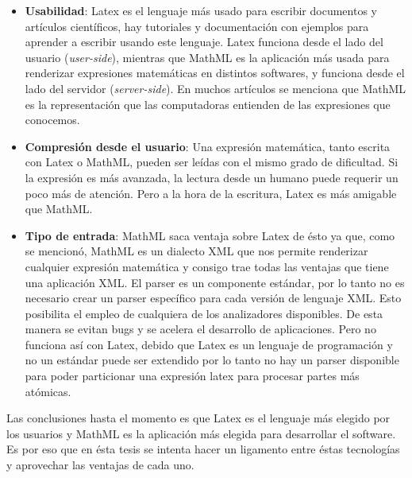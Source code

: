 \begin{itemize}
\item \textbf{Usabilidad}: Latex es el lenguaje más usado para escribir documentos y artículos científicos, hay tutoriales y documentación con ejemplos para aprender a escribir usando este lenguaje. Latex funciona desde el lado del usuario (\textit{user-side}), mientras que MathML es la aplicación más usada para renderizar expresiones matemáticas en distintos softwares, y funciona desde el lado del servidor (\textit{server-side}). En muchos artículos se menciona que MathML es la representación que las computadoras entienden de las expresiones que conocemos.
\item \textbf{Compresión desde el usuario}: Una expresión matemática, tanto escrita con Latex o MathML, pueden ser leídas con el mismo grado de dificultad. Si la expresión es más avanzada, la lectura desde un humano puede requerir un poco más de atención. Pero a la hora de la escritura, Latex es más amigable que MathML.
\item \textbf{Tipo de entrada}: MathML saca ventaja sobre Latex de ésto ya que, como se mencionó, MathML es un dialecto XML que nos permite renderizar cualquier expresión matemática y consigo trae todas las ventajas que tiene una aplicación XML. El parser es un componente estándar, por lo tanto no es necesario crear un parser específico para cada versión de lenguaje XML. Esto posibilita el empleo de cualquiera de los analizadores disponibles. De esta manera se evitan bugs y se acelera el desarrollo de aplicaciones. Pero no funciona así con Latex, debido que Latex es un lenguaje de programación y no un estándar puede ser extendido por lo tanto no hay un parser disponible para poder particionar una expresión latex para procesar partes más atómicas.
\end{itemize}

Las conclusiones hasta el momento es que Latex es el lenguaje más elegido por los usuarios y MathML es la aplicación más elegida para desarrollar el software. Es por eso que en ésta tesis se intenta hacer un ligamento entre éstas tecnologías y aprovechar las ventajas de cada uno.